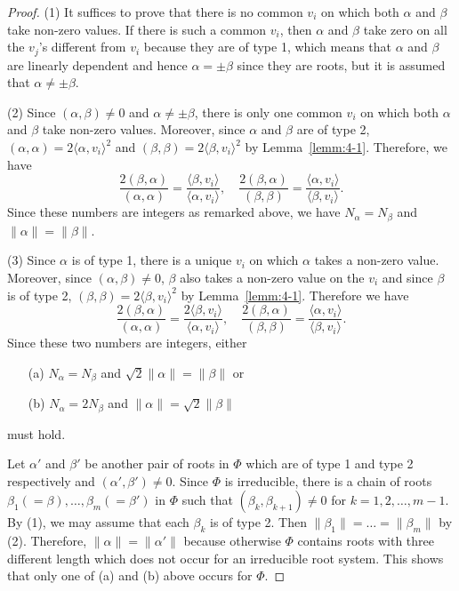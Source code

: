 \documentclass[12pt]{amsart}
\theoremstyle{plain} \numberwithin{equation}{section}
\theoremstyle{definition}
\begin{document}
\begin{proof}
(1) It suffices to prove that there is no common $v_i$ on which both $\alpha$ and $\beta$ take non-zero values.  If there is such a common $v_i$, then $\alpha$ and $\beta$ take zero on all the $v_j$'s different from $v_i$ because they are of type 1, which means that $\alpha$ and $\beta$ are linearly dependent and hence $\alpha=\pm\beta$ since they are roots, but it is assumed that $\alpha\not=\pm\beta$.     

(2) Since $(\alpha,\beta)\not=0$ and $\alpha\not=\pm \beta$, there is only one common $v_i$ on which both $\alpha$ and $\beta$ take non-zero values.  Moreover, since $\alpha$ and $\beta$ are of type 2, $(\alpha,\alpha)=2\langle\alpha,v_i\rangle^2$ and $(\beta,\beta)=2\langle\beta,v_i\rangle^2$ by Lemma~\ref{lemm:4-1}.  Therefore, we have   
\[
\frac{2(\beta,\alpha)}{(\alpha,\alpha)}=\frac{\langle\beta,v_i\rangle}{\langle\alpha,v_i\rangle},\quad 
 \frac{2(\beta,\alpha)}{(\beta,\beta)}=\frac{\langle\alpha,v_i\rangle}{\langle\beta,v_i\rangle}.
 \]
Since these numbers are integers as remarked above, we have $N_\alpha=N_\beta$ and $\|\alpha\|=\|\beta\|$.  

(3) Since $\alpha$ is of type 1, there is a unique $v_i$ on which $\alpha$ takes a non-zero value.  Moreover, since $(\alpha,\beta)\not=0$, $\beta$ also takes a non-zero value on the $v_i$ and since $\beta$ is of type 2, $(\beta,\beta)=2\langle\beta,v_i\rangle^2$ by Lemma~\ref{lemm:4-1}.  Therefore we have 
\[
\frac{2(\beta,\alpha)}{(\alpha,\alpha)}=\frac{2\langle\beta,v_i\rangle}{\langle\alpha,v_i\rangle},\quad 
 \frac{2(\beta,\alpha)}{(\beta,\beta)}=\frac{\langle\alpha,v_i\rangle}{\langle\beta,v_i\rangle}.
 \]
Since these two numbers are integers, either 
\begin{enumerate}
\item[(a)] $N_\alpha=N_\beta$ and $\sqrt{2}\|\alpha\|=\|\beta\|$ or
\item[(b)] $N_\alpha=2N_\beta$ and $\|\alpha\|=\sqrt{2}\|\beta\|$
\end{enumerate}
must hold.  

Let $\alpha'$ and $\beta'$ be another pair of roots in $\Phi$ which are of type 1 and type 2 respectively and $(\alpha',\beta')\not=0$.  Since $\Phi$ is irreducible, there is a chain of roots $\beta_1(=\beta),\dots,\beta_m(=\beta')$ in $\Phi$ such that $(\beta_k,\beta_{k+1})\not=0$ for $k=1,2,\dots,m-1$.  By (1), we may assume that each $\beta_k$ is of type 2.  Then $\|\beta_1\|=\dots=\|\beta_m\|$ by (2).  Therefore, $\|\alpha\|=\|\alpha'\|$ because otherwise $\Phi$ contains roots with three different length which does not occur for an irreducible root system.  This shows that only one of (a) and (b) above occurs for $\Phi$.  


\end{proof}
\end{document}
